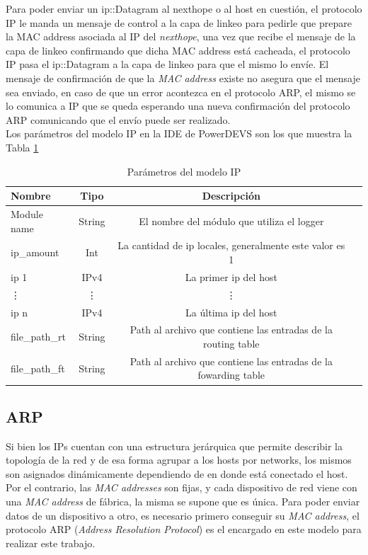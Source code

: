 \documentclass[10pt,a4paper]{article}
\begin{document}
Para poder enviar un ip::Datagram al nexthope o al host en cuestión, el protocolo IP le manda un mensaje de control a la capa de linkeo para pedirle que prepare la MAC address asociada al IP del \textit{nexthope}, una vez que recibe el mensaje de la capa de linkeo confirmando que dicha MAC address está cacheada, el protocolo IP pasa el ip::Datagram a la capa de linkeo para que el mismo lo envíe. El mensaje de confirmación de que la \textit{MAC address} existe no asegura que el mensaje sea enviado, en caso de que un error acontezca en el protocolo ARP, el mismo se lo comunica a IP que se queda esperando una nueva confirmación del protocolo ARP comunicando que el envío puede ser realizado. \\

Los parámetros del modelo IP en la IDE de PowerDEVS son los que muestra la Tabla \ref{table: parameters ip}

\begin{table}[h]
\begin{tabular}{|l|c|c|c|}
  \hline
  \textbf{Nombre} & \textbf{Tipo} & \textbf{Descripción} \\
  \hline
  Module name & String & El nombre del módulo que utiliza el logger \\
  \hline
  ip\_amount & Int & La cantidad de ip locales, generalmente este valor es 1 \\
  \hline
  ip 1 & IPv4 & La primer ip del host \\
  \hline
  \vdots & \vdots & \vdots \\
  \hline
  ip n & IPv4 & La última ip del host \\
  \hline
  file\_path\_rt & String & Path al archivo que contiene las entradas de la routing table \\
  \hline
  file\_path\_ft & String & Path al archivo que contiene las entradas de la fowarding table \\
  \hline
\end{tabular}
\caption{Parámetros del modelo IP}
\label{table: parameters ip}
\end{table}

\subsection{ARP}

Si bien los IPs cuentan con una estructura jerárquica que permite describir la topología de la red y de esa forma agrupar a los hosts por networks, los mismos son asignados dinámicamente dependiendo de en donde está conectado el host. Por el contrario, las \textit{MAC addresses} son fijas, y cada dispositivo de red viene con una \textit{MAC address} de fábrica, la misma se supone que es única. Para poder enviar datos de un dispositivo a otro, es necesario primero conseguir su \textit{MAC address}, el protocolo ARP (\textit{Address Resolution Protocol}) es el encargado en este modelo para realizar este trabajo. \\
\end{document}
